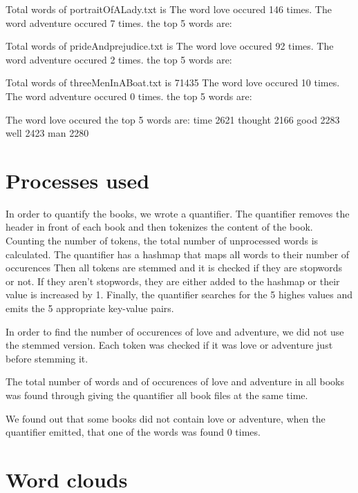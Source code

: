 \documentclass[a4paper,11pt,oneside]{book}
\begin{document}
Total words of portraitOfALady.txt is  
The word love occured 146 times.
The word adventure occured 7 times.
the top 5 words are: 


Total words of prideAndprejudice.txt is 
The word love occured 92 times.
The word adventure occured 2 times.
the top 5 words are: 



Total words of threeMenInABoat.txt is 71435
The word love occured 10 times.
The word adventure occured 0 times.
the top 5 words are: 


The word love occured 
the top 5 words are: 
time	2621
thought	2166
good	2283
well	2423
man	2280

\chapter{Processes used}
In order to quantify the books, we wrote a quantifier. The quantifier removes the header in front of each book and then tokenizes the content of the book. Counting the number of tokens, the total number of unprocessed words is calculated.
The quantifier has a hashmap that maps all words to their number of occurences
Then all tokens are stemmed and it is checked if they are stopwords or not. If they aren't stopwords, they are either added to the hashmap or their value is increased by 1.
Finally, the quantifier searches for the 5 highes values and emits the 5 appropriate key-value pairs.

In order to find the number of occurences of love and adventure, we did not use the stemmed version. Each token was checked if it was love or adventure just before stemming it.

The total number of words and of occurences of love and adventure in all books was found through giving the quantifier all book files at the same time.

We found out that some books did not contain love or adventure, when the quantifier emitted, that one of the words was found 0 times.


\chapter{Word clouds}


\pagebreak
\begin{thebibliography}{XXX}
	 \url{}
	 \url{}
	 \url{}
	 \url{}
	 \url{}
	 \url{}
	 \url{}
	 \url{}
	 \url{}
\end{thebibliography}
\end{document}
